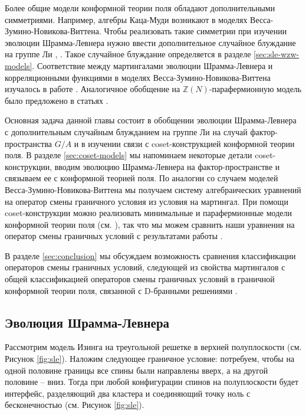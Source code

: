 Более общие модели конформной теории поля обладают дополнительными симметриями. Например, алгебры Каца-Муди возникают в моделях Весса-Зумино-Новикова-Виттена.  Чтобы реализовать такие симметрии при изучении эволюции Шрамма-Левнера нужно ввести дополнительное случайное блуждание на группе Ли \cite{bettelheim2005stochastic}, \cite{Rasmussen:2004xr}. Такое случайное блуждание определяется в разделе \ref{sec:sle-wzw-models}. Соответствие между мартингалами эволюции Шрамма-Левнера и корреляционными функциями в моделях Весса-Зумино-Новикова-Виттена изучалось в работе \cite{alekseev2010sle}. Аналогичное обобщение на $\mathbb{Z}(N)$-парафермионную модель было предложено в статьях \cite{santachiara2008sle,picco2008numerical}. 

Основная задача данной главы состоит в обобщении эволюции Шрамма-Левнера с дополнительным случайным блужданием на группе Ли на случай фактор-пространства  $G/A$ и в изучении связи с coset-конструкцией конформной теории поля. В разделе \ref{sec:coset-models} мы напоминаем некоторые детали coset-конструкции, вводим эволюцию Шрамма-Левнера на фактор-пространстве и связываем ее с конформной теорией поля. По аналогии со случаем моделей Весса-Зумино-Новикова-Виттена мы получаем систему алгебраических уравнений на оператор смены граничного условия из условия на мартингал. 
При помощи coset-конструкции можно реализовать минимальные и парафермионные модели конформной теории поля (см. \cite{difrancesco1997cft}), так что мы можем сравнить наши уравнения на оператор смены граничных условий с результатами работы \cite{santachiara2008sle}.

В разделе  \ref{sec:conclusion} мы обсуждаем возможность сравнения классификации операторов смены граничных условий, следующей из свойства мартингалов с общей классификацией операторов смены граничных условий в граничной конформной теории поля, связанной с D-бранными решениями \cite{fuchs2005geometry,fredenhagen2002d,elitzur2002d,Maldacena:2001ky,felder1999geometry,alekseev1999d}. 

\subsection{Эволюция Шрамма-Левнера}
\label{sec:schr-loewn-evol}
Рассмотрим модель Изинга на треугольной решетке в верхней полуплоскости (см. Рисунок \ref{fig:sle}). Наложим следующее граничное условие: потребуем, чтобы на одной половине границы все спины были направлены вверх, а на другой половине -- вниз. Тогда при любой конфигурации спинов на полуплоскости будет интерфейс, разделяющий два кластера и соединяющий точку ноль с бесконечностью (см. Рисунок \ref{fig:sle}).

